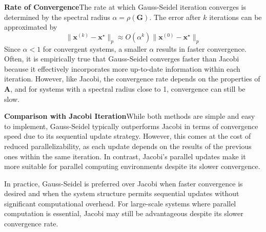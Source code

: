 \textbf{Rate of Convergence}\quad The rate at which Gauss-Seidel iteration converges is determined by the spectral radius $\alpha = \rho(\mathbf{G})$. The error after $k$ iterations can be approximated by
\begin{equation*}
    \|\mathbf{x}^{(k)} - \mathbf{x}^\star\|_p \approx O(\alpha^k) \|\mathbf{x}^{(0)} - \mathbf{x}^\star\|_p
\end{equation*}
Since $\alpha < 1$ for convergent systems, a smaller $\alpha$ results in faster convergence. Often, it is empirically true that Gauss-Seidel converges faster than Jacobi because it effectively incorporates more up-to-date information within each iteration. However, like Jacobi, the convergence rate depends on the properties of $\mathbf{A}$, and for systems with a spectral radius close to 1, convergence can still be slow.

\textbf{Comparison with Jacobi Iteration}\quad While both methods are simple and easy to implement, Gauss-Seidel typically outperforms Jacobi in terms of convergence speed due to its sequential update strategy. However, this comes at the cost of reduced parallelizability, as each update depends on the results of the previous ones within the same iteration. In contrast, Jacobi's parallel updates make it more suitable for parallel computing environments despite its slower convergence.

In practice, Gauss-Seidel is preferred over Jacobi when faster convergence is desired and when the system structure permits sequential updates without significant computational overhead. For large-scale systems where parallel computation is essential, Jacobi may still be advantageous despite its slower convergence rate.

